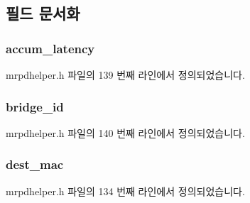 \subsection{필드 문서화}
\subsubsection[{\texorpdfstring{accum\+\_\+latency}{accum_latency}}]{ accum\+\_\+latency}\hypertarget{structmrpdhelper__msrp__talker_abb60ac86605db899ea9f083ba1f93021}{}\label{structmrpdhelper__msrp__talker_abb60ac86605db899ea9f083ba1f93021}


mrpdhelper.\+h 파일의 139 번째 라인에서 정의되었습니다.

\subsubsection[{\texorpdfstring{bridge\+\_\+id}{bridge_id}}]{ bridge\+\_\+id}\hypertarget{structmrpdhelper__msrp__talker_a05d67b8dd71c3dcbd399e2b0add3e129}{}\label{structmrpdhelper__msrp__talker_a05d67b8dd71c3dcbd399e2b0add3e129}


mrpdhelper.\+h 파일의 140 번째 라인에서 정의되었습니다.

\subsubsection[{\texorpdfstring{dest\+\_\+mac}{dest_mac}}]{ dest\+\_\+mac}\hypertarget{structmrpdhelper__msrp__talker_a205a8c33627111589223916ef80462c2}{}\label{structmrpdhelper__msrp__talker_a205a8c33627111589223916ef80462c2}


mrpdhelper.\+h 파일의 134 번째 라인에서 정의되었습니다.


